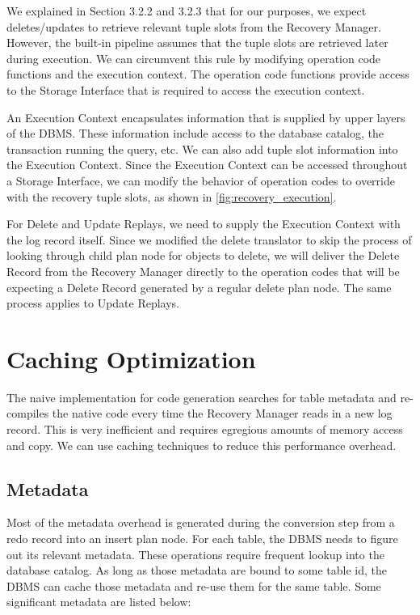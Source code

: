 \documentclass[12pt]{cmuthesis}
\begin{document}
We explained in Section 3.2.2 and 3.2.3 that for our purposes, we expect deletes/updates to retrieve relevant tuple slots from the Recovery Manager. However, the built-in pipeline assumes that the tuple slots are retrieved later during execution. We can circumvent this rule by modifying operation code functions and the execution context. The operation code functions provide access to the Storage Interface that is required to access the execution context.

An Execution Context encapsulates information that is supplied by upper layers of the DBMS. These information include access to the database catalog, the transaction running the query, etc. We can also add tuple slot information into the Execution Context. Since the Execution Context can be accessed throughout a Storage Interface, we can modify the behavior of operation codes to override with the recovery tuple slots, as shown in \cref{fig:recovery_execution}.

For Delete and Update Replays, we need to supply the Execution Context with the log record itself. Since we modified the delete translator to skip the process of looking through child plan node for objects to delete, we will deliver the Delete Record from the Recovery Manager directly to the operation codes that will be expecting a Delete Record generated by a regular delete plan node. The same process applies to Update Replays.

\section{Caching Optimization}

The naive implementation for code generation searches for table metadata and re-compiles the native code every time the Recovery Manager reads in a new log record. This is very inefficient and requires egregious amounts of memory access and copy. We can use caching techniques to reduce this performance overhead.

\subsection{Metadata}
Most of the metadata overhead is generated during the conversion step from a redo record into an insert plan node. For each table, the DBMS needs to figure out its relevant metadata. These operations require frequent lookup into the database catalog. As long as those metadata are bound to some table id, the DBMS can cache those metadata and re-use them for the same table. Some significant metadata are listed below:
\end{document}

